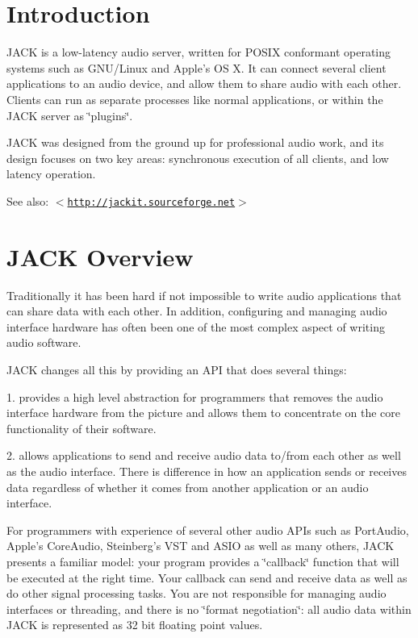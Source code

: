 \hypertarget{index_intro}{}\section{Introduction}\label{index_intro}
JACK is a low-latency audio server, written for POSIX conformant operating systems such as GNU/Linux and Apple's OS X. It can connect several client applications to an audio device, and allow them to share audio with each other. Clients can run as separate processes like normal applications, or within the JACK server as \char`\"{}plugins\char`\"{}.

JACK was designed from the ground up for professional audio work, and its design focuses on two key areas: synchronous execution of all clients, and low latency operation.

\begin{Desc}
\item[See also:]$<$\href{http://jackit.sourceforge.net}{\tt http://jackit.sourceforge.net}$>$\end{Desc}
\hypertarget{index_jack_overview}{}\section{JACK Overview}\label{index_jack_overview}
Traditionally it has been hard if not impossible to write audio applications that can share data with each other. In addition, configuring and managing audio interface hardware has often been one of the most complex aspect of writing audio software.

JACK changes all this by providing an API that does several things:

1. provides a high level abstraction for programmers that removes the audio interface hardware from the picture and allows them to concentrate on the core functionality of their software.

2. allows applications to send and receive audio data to/from each other as well as the audio interface. There is difference in how an application sends or receives data regardless of whether it comes from another application or an audio interface.

For programmers with experience of several other audio APIs such as Port\-Audio, Apple's Core\-Audio, Steinberg's VST and ASIO as well as many others, JACK presents a familiar model: your program provides a \char`\"{}callback\char`\"{} function that will be executed at the right time. Your callback can send and receive data as well as do other signal processing tasks. You are not responsible for managing audio interfaces or threading, and there is no \char`\"{}format negotiation\char`\"{}: all audio data within JACK is represented as 32 bit floating point values.

